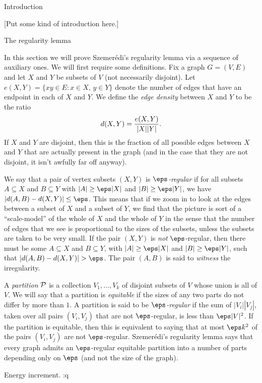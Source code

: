 


\def\P{{\cal P}}

\classicmode
{}

\advsect Introduction

[Put some kind of introduction here.]

\advsect The regularity lemma

In this section we will prove Szemer\'edi's regularity lemma via a sequence of auxiliary ones. We will
first require some definitions. Fix a graph $G=(V,E)$ and let $X$ and $Y$ be subsets of $V$ (not necessarily
disjoint). Let $e(X,Y) = \{xy \in E : x\in X,\,y\in Y\}$ denote the number of edges that have an endpoint
in each of $X$ and $Y$. We define the {\it edge density} between $X$ and $Y$ to be the ratio
$$d(X,Y) = {e(X,Y)\over |X||Y|}.$$
If $X$ and $Y$ are disjoint, then this is the fraction of all possible edges between $X$ and $Y$ that are
actually present in the graph (and in the case that they are not disjoint, it isn't awfully far off anyway).

We say that a pair of vertex subsets $(X,Y)$ is {\it $\eps$-regular} if for all subsets $A\subseteq X$ and
$B\subseteq Y$ with $|A|\geq \eps|X|$ and $|B|\geq \eps|Y|$, we have $|d(A,B)- d(X,Y)|\leq \eps$. This means that
if we zoom in to look at the edges between a subset of $X$ and a subset of $Y$, we find that the picture is sort of
a ``scale-model'' of the whole of $X$ and the whole of $Y$ in the sense that the number of edges that
we see is proportional to the sizes of the subsets, unless the subsets are taken to be very small. If the pair
$(X,Y)$ is {\it not} $\eps$-regular, then there must be some $A\subseteq X$ and $B\subseteq Y$, with
$|A|\geq \eps|X|$ and $|B| \geq \eps|Y|$, such that $|d(A,B)-d(X,Y)|>\eps$. The pair $(A,B)$ is said to
{\it witness} the irregularity.

A {\it partition} $\P$ is a collection $V_1,\ldots,V_k$ of disjoint subsets of $V$ whose union is all of $V$.
We will say that a partition is {\it equitable} if the sizes of any two parts do not differ by more than $1$.
A partition is said to be {\it $\eps$-regular} if the sum of $|V_i||V_j|$, taken over all pairs $(V_i,V_j)$
that are not $\eps$-regular, is less than $\eps |V|^2$. If the partition is equitable, then this is equivalent
to saying that at most $\eps k^2$ of the pairs $(V_i,V_j)$ are not $\eps$-regular. Szemer\'edi's regularity
lemma says that every graph admits an $\eps$-regular equitable partition into a number of parts depending
only on $\eps$ (and not the size of the graph).

\medskip
\boldlabel Energy increment. :q


\bye
